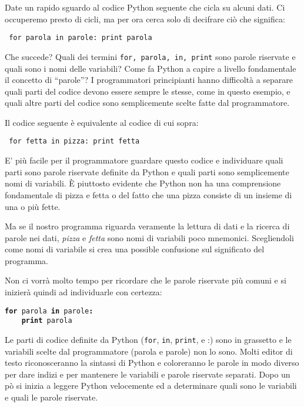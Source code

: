 Date un rapido sguardo al codice Python seguente che cicla su alcuni dati. Ci occuperemo presto di cicli, ma per ora cerca solo di decifrare ci\`{o} che significa:

\beforeverb \begin{verbatim} for parola in parole: print parola
\end{verbatim} \afterverb
%
Che succede? Quali dei termini {\tt for, parola, in, print} sono parole riservate e quali sono i nomi delle variabili? Come fa Python a capire a livello fondamentale il concetto di {``}parole''? I programmatori principianti hanno difficolt\`{a} a separare quali parti del codice devono essere sempre le stesse, come in questo esempio, e quali altre parti del codice sono semplicemente scelte fatte dal programmatore.


Il codice seguente \`{e} equivalente al codice di cui sopra:

\beforeverb \begin{verbatim} for fetta in pizza: print fetta
\end{verbatim} \afterverb
%
E' pi\`{u} facile per il programmatore guardare questo codice e individuare quali parti sono parole riservate definite da Python e quali parti sono semplicemente nomi di variabili. \`{E} piuttosto evidente che Python non ha una comprensione fondamentale di pizza e fetta o del fatto che una pizza consiste di un insieme di una o pi\`{u} fette.


Ma se il nostro programma riguarda veramente la lettura di dati e la ricerca di parole nei dati, \emph{pizza }e \emph{fetta }sono nomi di variabili poco mnemonici. Scegliendoli come nomi di variabile si crea una possible confusione sul significato del programma.


Non ci vorr\`{a} molto tempo per ricordare che le parole riservate pi\`{u} comuni e si inizier\`{a} quindi ad individuarle con certezza:

{\tt {\bf for} parola {\bf in} parole{\bf :}\\ \verb"    "{\bf print} parola
}

Le parti di codice definite da Python ({\tt for}, {\tt in},
{\tt print}, e {\tt }:) sono in grassetto e le variabili scelte dal programmatore (parola e parole) non lo sono. Molti editor di testo riconosceranno la sintassi di Python e coloreranno le parole in modo diverso per dare indizi e per mantenere le variabili e parole riservate separati. Dopo un p\`{o} si inizia a leggere Python velocemente ed a determinare quali sono le variabili e quali le parole riservate.

